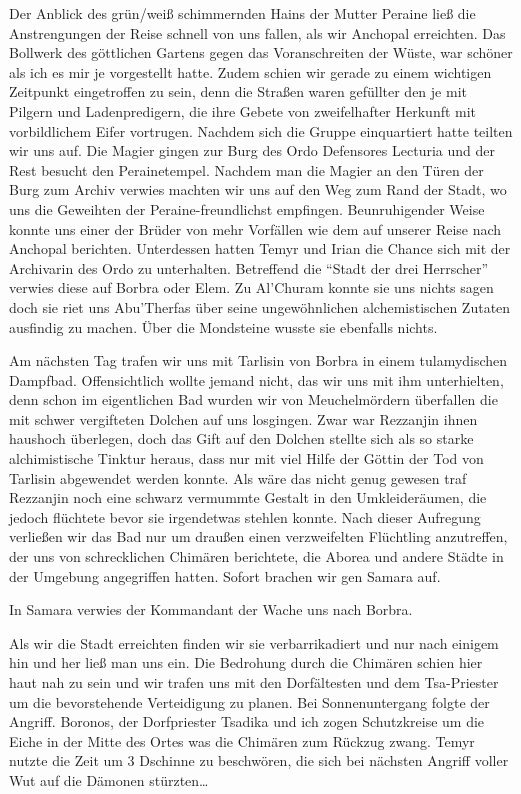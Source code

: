 Der Anblick des grün/weiß schimmernden Hains der Mutter Peraine ließ die Anstrengungen der Reise schnell von uns fallen, als wir Anchopal erreichten. Das Bollwerk des göttlichen Gartens gegen das Voranschreiten der Wüste, war schöner als ich es mir je vorgestellt hatte. Zudem schien wir gerade zu einem wichtigen Zeitpunkt eingetroffen zu sein, denn die Straßen waren gefüllter den je mit Pilgern und Ladenpredigern, die ihre Gebete von zweifelhafter Herkunft mit vorbildlichem Eifer vortrugen. Nachdem sich die Gruppe einquartiert hatte teilten wir uns auf. Die Magier gingen zur Burg des Ordo Defensores Lecturia und der Rest besucht den Perainetempel. Nachdem man die Magier an den Türen der Burg zum Archiv verwies machten wir uns auf den Weg zum Rand der Stadt, wo uns die Geweihten der Peraine-freundlichst empfingen. Beunruhigender Weise konnte uns einer der Brüder von mehr Vorfällen wie dem auf unserer Reise nach Anchopal berichten. Unterdessen hatten Temyr und Irian die Chance sich mit der Archivarin des Ordo zu unterhalten. Betreffend die ``Stadt der drei Herrscher'' verwies diese auf Borbra oder Elem. Zu Al'Churam konnte sie uns nichts sagen doch sie riet uns Abu'Therfas über seine ungewöhnlichen alchemistischen Zutaten ausfindig zu machen. Über die Mondsteine wusste sie ebenfalls nichts.

Am nächsten Tag trafen wir uns mit Tarlisin von Borbra in einem tulamydischen Dampfbad. Offensichtlich wollte jemand nicht, das wir uns mit ihm unterhielten, denn schon im eigentlichen Bad wurden wir von Meuchelmördern überfallen die mit schwer vergifteten Dolchen auf uns losgingen. Zwar war Rezzanjin ihnen haushoch überlegen, doch das Gift auf den Dolchen stellte sich als so starke alchimistische Tinktur heraus, dass nur mit viel Hilfe der Göttin der Tod von Tarlisin abgewendet werden konnte. Als wäre das nicht genug gewesen traf Rezzanjin noch eine schwarz vermummte Gestalt in den Umkleideräumen, die jedoch flüchtete bevor sie irgendetwas stehlen konnte. Nach dieser Aufregung verließen wir das Bad nur um draußen einen verzweifelten Flüchtling anzutreffen, der uns von schrecklichen Chimären berichtete, die Aborea und andere Städte in der Umgebung angegriffen hatten. Sofort brachen wir gen Samara auf.

In Samara verwies der Kommandant der Wache uns nach Borbra.

Als wir die Stadt erreichten finden wir sie verbarrikadiert und nur nach einigem hin und her ließ man uns ein. Die Bedrohung durch die Chimären schien hier haut nah zu sein und wir trafen uns mit den Dorfältesten und dem Tsa-Priester um die bevorstehende Verteidigung zu planen. Bei Sonnenuntergang folgte der Angriff. Boronos, der Dorfpriester Tsadika und ich zogen Schutzkreise um die Eiche in der Mitte des Ortes was die Chimären zum Rückzug zwang. Temyr nutzte die Zeit um 3 Dschinne zu beschwören, die sich bei nächsten Angriff voller Wut auf die Dämonen stürzten\dots

